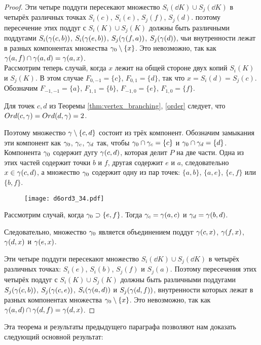 \begin{proof}
Эти четыре поддуги пересекают множество $S_i(\dd K)\cup S_j(\dd K)$ в четырёх различных точках $S_i(c)$, $S_i(e)$, $S_j(f)$, $S_j(d)$. 
поэтому пересечение этих поддуг с $S_i( K)\cup S_j(K)$ должны быть различными поддугами $S_i(\gamma(c,b))$,  $S_i(\gamma(e,b))$, $S_j(\gamma(f,a))$, $S_j(\gamma(d))$, чьи внутренности лежат в разных компонентах множества $\gamma_0\setminus\{x\}$. 
Это невозможно, так как $\gamma(a,f)\cap\gamma(a,d)=\gamma(a,x)$.\\

Рассмотрим теперь случай, когда $x$ лежит на общей стороне двух копий $S_i(K)$ и $S_j(K)$. 
В этом случае $F_{0,-1}=\{c\}$, $F_{0,1}=\{d\}$, так что $x=S_i(d)=S_j(c)$.  
Обозначим $F_{-1,-1}=\{a\}$, $F_{1 ,1}=\{b\}$, $F_{-1,0}=\{e\}$, $F_{1,0}=\{f\}$.

Для точек $c,d$ из Теоремы \ref{thm:vertex_branching}, \ref{order} следует, что $Ord(c,\gamma)=Ord(d,\gamma)=2$. 

Поэтому множество $\gamma\setminus\{c,d\}$  состоит из трёх компонент. 
Обозначим замыкания эти компонент как $\gamma_0$, $\gamma_c$, $\gamma_d$ так, чтобы $\gamma_0\cap\gamma_c=\{c\}$ и $\gamma_0\cap \gamma_d=\{d\}$. 
Компонента $\gamma_0$ содержит дугу $\gamma(c,d)$, которая делит $P$ на две части. 
Одна из этих частей содержит точки $b$ и $f$, другая содержит $e$ и $a$, следовательно $x\in \gamma(c,d)$, а множество $\gamma_0$ содержит одну из пар точек: $\{a,b\}$, $\{a,e\}$, $\{e,f\}$ или $\{b,f\}$. 

\begin{figure}[H]
    \centering
    \texttt{[image: d6ord3\_34.pdf]}
\end{figure}

Рассмотрим случай, когда $\gamma_0\supset\{e,f\}$. 
Тогда $\gamma_c=\gamma(a,c)$ и $\gamma_d=\gamma(b,d)$.

Следовательно, множество $\gamma_0$ является объединением поддуг  $\gamma(c,x)$, $\gamma(f,x)$, $\gamma(d,x)$ и $\gamma(e,x)$.

Эти четыре поддуги пересекают множество $S_i(\dd K)\cup S_j(\dd K)$ в четырёх различных точках: $S_i(e)$, $S_i(b)$, $S_j(f)$ и $S_j(a)$. 
Поэтому пересечения этих четырёх поддуг с $S_i( K)\cup S_j(K)$ должны быть различными поддугами $S_j(\gamma(c,b))$, $S_j(\gamma(c,e))$, $S_i(\gamma(a,d))$ и $S_j(\gamma(d,f))$, внутренности которых лежат в разных компонентах множества $\gamma_0\setminus\{x\}$. 
Это невозможно, так как $\gamma(a,d)\cap\gamma(d,f)=\gamma(d,x)$.
\end{proof}

Эта теорема и результаты предыдущего параграфа позволяют нам доказать следующий основной результат:

